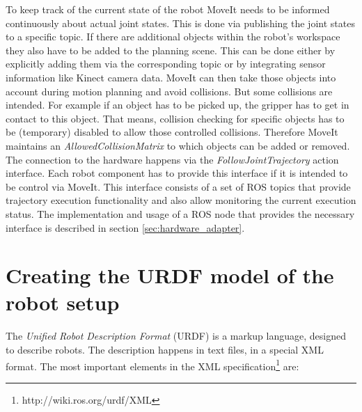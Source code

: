 To keep track of the current state of the robot MoveIt needs to be informed continuously about actual joint states. This is done via publishing the joint states to a specific topic. If there are additional objects within the robot's workspace they also have to be added to the planning scene. This can be done either by explicitly adding them via the corresponding topic or by integrating sensor information like Kinect camera data. MoveIt can then take those objects into account during motion planning and avoid collisions. But some collisions are intended. For example if an object has to be picked up, the gripper has to get in contact to this object. That means, collision checking for specific objects has to be (temporary) disabled to allow those controlled collisions. Therefore MoveIt maintains an \emph{AllowedCollisionMatrix} to which objects can be added or removed. The connection to the hardware happens via the \emph{FollowJointTrajectory} action interface. Each robot component has to provide this interface if it is intended to be control via MoveIt. This interface consists of a set of ROS topics that provide trajectory execution functionality and also allow monitoring the current execution status. The implementation and usage of a ROS node that provides the necessary interface is described in section \ref{sec:hardware_adapter}.

\section{Creating the URDF model of the robot setup}
\label{sec:urdf}

The \emph{Unified Robot Description Format} (URDF) is a markup language, designed to describe robots. The description happens in text files, in a special XML format. The most important elements in the XML specification\footnote{http://wiki.ros.org/urdf/XML} are:

